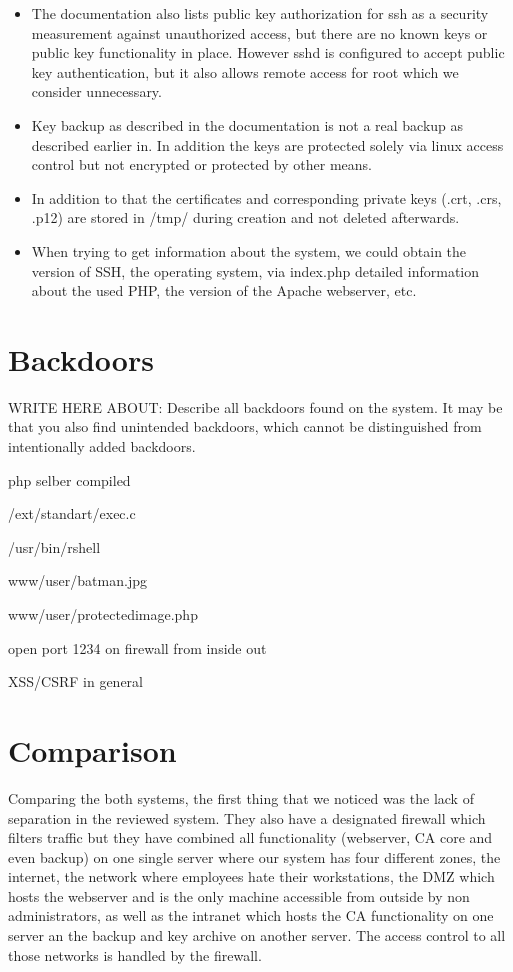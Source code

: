\documentclass{article}
\begin{document}
\begin{itemize}
\item The documentation also lists public key authorization for ssh as a security measurement against unauthorized access, but there are no known keys or public key functionality in place. However sshd is configured to accept public key authentication, but it also allows remote access for root which we consider unnecessary.

\item Key backup as described in the documentation is not a real backup as described earlier in. In addition the keys are protected solely via linux access control but not encrypted or protected by other means.

\item In addition to that the certificates and corresponding private keys (.crt, .crs, .p12) are stored in /tmp/ during creation and not deleted afterwards. 

\item When trying to get information about the system, we could obtain the version of SSH, the operating system, via index.php detailed information about the used PHP, the version of the Apache webserver, etc.
\end{itemize}

\section{Backdoors}
WRITE HERE ABOUT: 
Describe all backdoors found on the system. 
It may be that you also find unintended backdoors, which cannot be distinguished from intentionally added backdoors.


php selber compiled


/ext/standart/exec.c


/usr/bin/rshell


www/user/batman.jpg


www/user/protectedimage.php


open port 1234 on firewall from inside out


XSS/CSRF in general


\section{Comparison}
Comparing the both systems, the first thing that we noticed was the lack of separation in the reviewed system. They also have a designated firewall which filters traffic but they have combined all functionality (webserver, CA core and even backup) on one single server where our system has four different zones, the internet, the network where employees hate their workstations, the DMZ which hosts the webserver and is the only machine accessible from outside by non administrators, as well as the intranet which hosts the CA functionality on one server an the backup and key archive on another server. The access control to all those networks is handled by the firewall.
\end{document}
